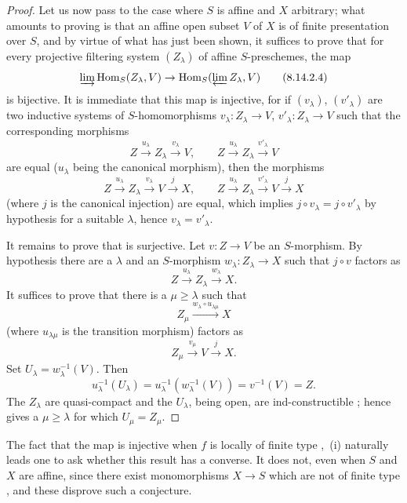 \begin{proof}
Let us now pass to the case where $S$ is affine and $X$ arbitrary; what amounts to proving is that an affine open subset $V$ of $X$ is of finite presentation over $S$, and by virtue of what has just been shown, it suffices to prove that for every projective filtering system $(Z_\lambda)$ of affine $S$-preschemes, the map
\begin{equation}
\label{IV.8.14.2.4}
\varinjlim\operatorname{Hom}_S(Z_\lambda,V)\to\operatorname{Hom}_S(\varprojlim Z_\lambda,V) \tag{8.14.2.4}
\end{equation}
is bijective.
It is immediate that this map is injective, for if $(v_\lambda)$, $(v'_\lambda)$ are two inductive systems of $S$-homomorphisms $v_\lambda:Z_\lambda\to V$, $v'_\lambda:Z_\lambda\to V$ such that the corresponding morphisms
\[
Z\xrightarrow{u_\lambda}Z_\lambda\xrightarrow{v_\lambda}V,\qquad
Z\xrightarrow{u_\lambda}Z_\lambda\xrightarrow{v'_\lambda}V
\]
are equal ($u_\lambda$ being the canonical morphism), then the morphisms
\[
Z\xrightarrow{u_\lambda}Z_\lambda\xrightarrow{v_\lambda}V\xrightarrow{j}X,\qquad Z\xrightarrow{u_\lambda}Z_\lambda\xrightarrow{v'_\lambda}V\xrightarrow{j}X
\]
(where $j$ is the canonical injection) are equal, which implies $j\circ v_\lambda=j\circ v'_\lambda$ by hypothesis for a suitable $\lambda$, hence $v_\lambda=v'_\lambda$.

It remains to prove that  is surjective.
Let $v:Z\to V$ be an $S$-morphism.
By hypothesis there are a $\lambda$ and an $S$-morphism
$w_\lambda:Z_\lambda\to X$ such that $j\circ v$ factors as
\[
 Z\xrightarrow{u_\lambda}Z_\lambda\xrightarrow{w_\lambda}X.
\]
It suffices to prove that there is a $\mu\geqslant\lambda$ such that
\[
 Z_\mu\xrightarrow{w_\lambda\circ u_{\lambda\mu}}X
\]
(where $u_{\lambda\mu}$ is the transition morphism) factors as
\[
 Z_\mu\xrightarrow{v_\mu}V\xrightarrow{j}X.
\]
Set $U_\lambda=w_\lambda^{-1}(V)$.
Then
\[
 u_\lambda^{-1}(U_\lambda)
 =u_\lambda^{-1}(w_\lambda^{-1}(V))
 =v^{-1}(V)=Z.
\]
The $Z_\lambda$ are quasi-compact and the $U_\lambda$, being open, are
ind-constructible ; hence  gives a
$\mu\geqslant\lambda$ for which $U_\mu=Z_\mu$.
\end{proof}

\begin{remark}[8.14.3]
\label{IV.8.14.3}
The fact that the map  is injective when $f$ is locally of finite
type ,~(i) naturally leads one to ask whether this result has a converse.
It does not, even when $S$ and $X$ are affine, since there exist monomorphisms
$X\to S$ which are not of finite type , and these disprove such a
conjecture.
\end{remark}
